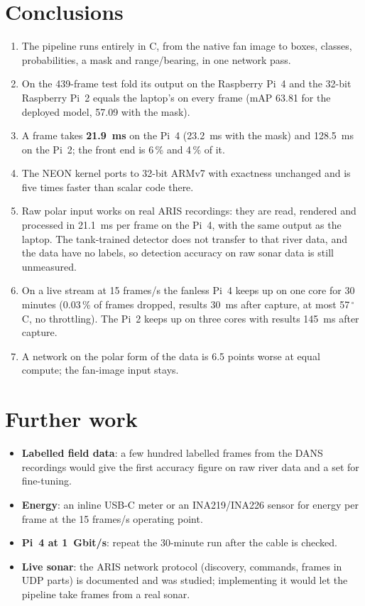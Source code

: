 \documentclass[11pt,a4paper]{article}
\begin{document}
\section{Conclusions}

\begin{enumerate}
  \item The pipeline runs entirely in C, from the native fan image to
        boxes, classes, probabilities, a mask and range/bearing, in one
        network pass.
  \item On the 439-frame test fold its output on the Raspberry Pi~4 and
        the 32-bit Raspberry Pi~2 equals the laptop's on every frame (mAP
        63.81 for the deployed model, 57.09 with the mask).
  \item A frame takes \textbf{21.9~ms} on the Pi~4 (23.2~ms with the mask)
        and 128.5~ms on the Pi~2; the front end is 6\,\% and 4\,\% of it.
  \item The NEON kernel ports to 32-bit ARMv7 with exactness unchanged and
        is five times faster than scalar code there.
  \item Raw polar input works on real ARIS recordings: they are read,
        rendered and processed in 21.1~ms per frame on the Pi~4, with the
        same output as the laptop. The tank-trained detector does not
        transfer to that river data, and the data have no labels, so
        detection accuracy on raw sonar data is still unmeasured.
  \item On a live stream at 15 frames/s the fanless Pi~4 keeps up on one
        core for 30 minutes (0.03\,\% of frames dropped, results 30~ms after
        capture, at most 57\,$^\circ$C, no throttling). The Pi~2 keeps up on
        three cores with results 145~ms after capture.
  \item A network on the polar form of the data is 6.5 points worse at equal
        compute; the fan-image input stays.
\end{enumerate}

\section{Further work}

\begin{itemize}
  \item \textbf{Labelled field data}: a few hundred labelled frames from the
        DANS recordings would give the first accuracy figure on raw river
        data and a set for fine-tuning.
  \item \textbf{Energy}: an inline USB-C meter or an INA219/INA226 sensor
        for energy per frame at the 15 frames/s operating point.
  \item \textbf{Pi~4 at 1~Gbit/s}: repeat the 30-minute run after the cable
        is checked.
  \item \textbf{Live sonar}: the ARIS network protocol (discovery, commands,
        frames in UDP parts) is documented and was studied; implementing it
        would let the pipeline take frames from a real sonar.
\end{itemize}
\end{document}
